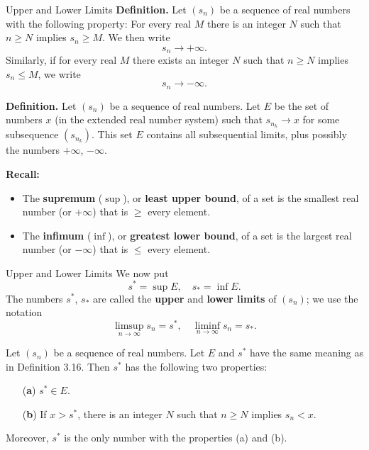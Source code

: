 \documentclass{beamer}
\begin{document}
\begin{frame}{Upper and Lower Limits}
\textbf{Definition.} Let $(s_n)$ be a sequence of real numbers with the
following property: For every real $M$ there is an integer $N$ such that $n \geq
N$ implies $s_n \geq M$. We then write
\[
s_n \to +\infty.
\]
Similarly, if for every real $M$ there exists an integer $N$ such that $n \geq
N$ implies $s_n \leq M$, we write
\[
s_n \to -\infty.
\]


\textbf{Definition.} Let $(s_n)$ be a sequence of real numbers. Let $E$ be the
set of numbers $x$ (in the extended real number system) such that $s_{n_k} \to
x$ for some subsequence $(s_{n_k})$. This set $E$ contains all subsequential
limits, plus possibly the numbers $+\infty$, $-\infty$.

\medskip %
\noindent\textbf{Recall:}
\begin{itemize}
    \item The \textbf{supremum} ($\sup$), or \textbf{least upper bound}, of a
    set is the smallest real number (or $+\infty$) that is $\geq$ every element.
    \item The \textbf{infimum} ($\inf$), or \textbf{greatest lower bound}, of a
    set is the largest real number (or $-\infty$) that is $\leq$ every element.
\end{itemize}
\end{frame}
\begin{frame}{Upper and Lower Limits}
\medskip
We now put
\[
s^* = \sup E, \quad s_* = \inf E.
\]
The numbers $s^*$, $s_*$ are called the \textbf{upper} and \textbf{lower limits}
of $(s_n)$; we use the notation
\[
\limsup_{n \to \infty} s_n = s^*, \quad \liminf_{n \to \infty} s_n = s_*.
\]

\begin{theorem}
Let $(s_n)$ be a sequence of real numbers. Let $E$ and $s^*$ have the same
meaning as in Definition 3.16. Then $s^*$ has the following two properties:
\begin{enumerate}
    \item[(\textbf{a})] $s^* \in E$.
    \item[(\textbf{b})] If $x > s^*$, there is an integer $N$ such that $n \geq
    N$ implies $s_n < x$.
\end{enumerate}
Moreover, $s^*$ is the only number with the properties (a) and (b).
\end{theorem}

\end{frame}
\end{document}
